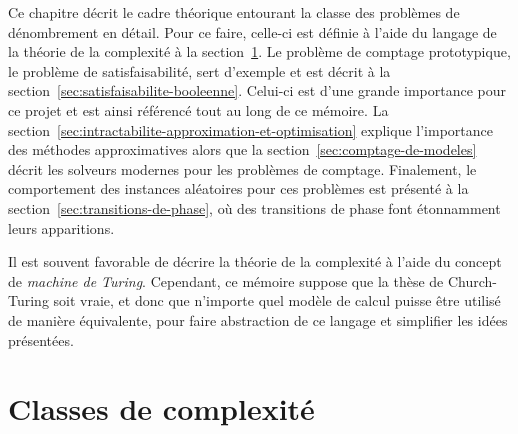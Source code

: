 Ce chapitre décrit le cadre théorique entourant la classe des problèmes de dénombrement en détail. Pour ce faire, celle-ci est définie à l'aide du langage de la théorie de la complexité à la section~\ref{sec:classes-de-complexite}. Le problème de comptage prototypique, le problème de satisfaisabilité, sert d'exemple et est décrit à la section~\ref{sec:satisfaisabilite-booleenne}. Celui-ci est d'une grande importance pour ce projet et est ainsi référencé tout au long de ce mémoire. La section~\ref{sec:intractabilite-approximation-et-optimisation} explique l'importance des méthodes approximatives alors que la section~\ref{sec:comptage-de-modeles} décrit les solveurs modernes pour les problèmes de comptage. Finalement, le comportement des instances aléatoires pour ces problèmes est présenté à la section~\ref{sec:transitions-de-phase}, où des transitions de phase font étonnamment leurs apparitions.

Il est souvent favorable de décrire la théorie de la complexité à l'aide du concept de \textit{machine de Turing}. Cependant, ce mémoire suppose que la thèse de Church-Turing soit vraie, et donc que n'importe quel modèle de calcul puisse être utilisé de manière équivalente, pour faire abstraction de ce langage et simplifier les idées présentées.


\section{Classes de complexité}
\label{sec:classes-de-complexite}

